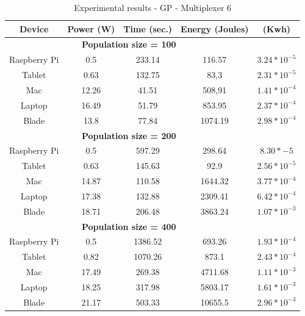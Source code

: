 


\begin{small}

\begin{table}[!ht]
\renewcommand{\arraystretch}{1.3}
\centering
\caption{Experimental results - GP - Multiplexer 6}
\label{Table:result_todos}
\begin{tabular}{ccccc} \hline
Device & Power (W) & Time (sec.) & Energy (Joules) & (Kwh) \\ \hline
\multicolumn{4}{c}{\textbf{Population size = 100}}\\ %
Raspberry Pi & 0.5 & 233.14 &116.57 & $3.24*10^{-5}$ \\
Tablet & 0.63 & 132.75 & 83,3 & $2.31*10^{-5}$ \\
Mac & 12.26 & 41.51 & 508,91 & $1.41*10^{-4}$ \\
Laptop & 16.49 & 51.79 & 853.95 & $2.37*10^{-4}$ \\
Blade & 13.8 & 77.84 & 1074.19 & $2.98*10^{-4}$ \\ \hline
\multicolumn{4}{c}{\textbf{Population size = 200}}\\ %
Raspberry Pi & 0.5 & 597.29 & 298.64 & $8.30*{-5}$ \\
Tablet & 0.63 & 145.63 & 92.9 & $2.56*10^{-5}$ \\
Mac & 14.87 & 110.58 & 1644.32 & $3.77*10^{-4}$ \\
Laptop	& 17.38 & 132.88 & 2309.41 & $6.42*10^{-4}$ \\
Blade & 18.71 & 206.48 & 3863.24 & $1.07*10^{-3}$ \\ \hline
\multicolumn{4}{c}{\textbf{Population size = 400}}\\ %
 Raspberry Pi & 0.5 & 1386.52 & 693.26 & $1.93*10^{-4}$ \\
Tablet & 0.82 & 1070.26 & 873.1 & $2.43*10^{-4}$\\
Mac&17.49 & 269.38 & 4711.68 & $1.11*10^{-3}$\\
Laptop & 18.25 & 317.98 & 5803.17 & $1.61*10^{-3}$\\
Blade & 21.17 & 503.33 & 10655.5 & $2.96*10^{-3}$ \\ \hline

\end{tabular}
\end{table}
\end{small}
